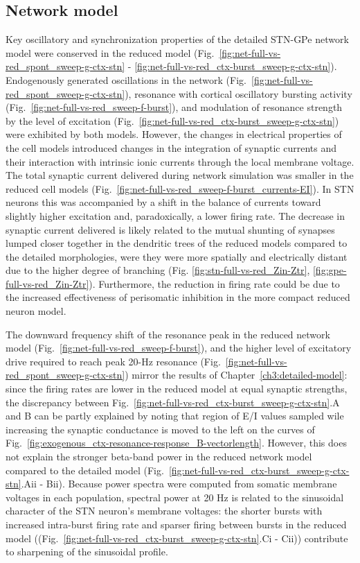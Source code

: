 %
\subsection{Network model}

%
Key oscillatory and synchronization properties of the detailed STN-GPe network
model were conserved in the reduced model (Fig.~\ref{fig:net-full-vs-red_spont_sweep-g-ctx-stn} -
\ref{fig:net-full-vs-red_ctx-burst_sweep-g-ctx-stn}).
%
Endogenously generated oscillations in the network (Fig.~\ref{fig:net-full-vs-red_spont_sweep-g-ctx-stn}),
resonance with cortical oscillatory bursting activity (Fig.~\ref{fig:net-full-vs-red_sweep-f-burst}),
and modulation of resonance strength by the level of excitation (Fig.~\ref{fig:net-full-vs-red_ctx-burst_sweep-g-ctx-stn}) were exhibited by both models.
%
However, the changes in electrical properties of the cell models introduced changes
in the integration of synaptic currents and their interaction with intrinsic ionic currents
through the local membrane voltage. The total synaptic current delivered during
network simulation was smaller in the reduced cell models (Fig.~\ref{fig:net-full-vs-red_sweep-f-burst_currents-EI}).
In STN neurons this was accompanied by a shift in the balance of currents toward
slightly higher excitation and, paradoxically, a lower firing rate.
The decrease in synaptic current delivered is likely related to the mutual shunting of
synapses \cite{segev_what_2006} lumped closer together in the dendritic trees
of the reduced models compared to the detailed morphologies, were they were more
spatially and electrically distant due to the higher degree of branching (Fig.
\ref{fig:stn-full-vs-red_Zin-Ztr}, \ref{fig:gpe-full-vs-red_Zin-Ztr}).
Furthermore, the reduction in firing rate could be due to the increased effectiveness of
perisomatic inhibition in the more compact reduced neuron model.
%

%
The downward frequency shift of the resonance peak in the reduced network model
(Fig.~\ref{fig:net-full-vs-red_sweep-f-burst}), and the higher level of excitatory
drive required to reach peak 20-Hz resonance (Fig.~\ref{fig:net-full-vs-red_spont_sweep-g-ctx-stn})
mirror the results of Chapter~\ref{ch3:detailed-model}: since the firing rates are
lower in the reduced model at equal synaptic strengths, the discrepancy between
Fig.~\ref{fig:net-full-vs-red_ctx-burst_sweep-g-ctx-stn}.A and B can be partly explained by noting that
region of E/I values sampled wile increasing the synaptic conductance is moved to the left on the curves of
Fig.~\ref{fig:exogenous_ctx-resonance-response_B-vectorlength}.
%
However, this does not explain the stronger beta-band power in the reduced network model
compared to the detailed model (Fig.~\ref{fig:net-full-vs-red_ctx-burst_sweep-g-ctx-stn}.Aii - Bii).
Because power spectra were computed from somatic membrane voltages in each population,
spectral power at 20 Hz is related to the sinusoidal character of the STN neuron's membrane voltages:
the shorter bursts with increased intra-burst firing rate and sparser firing between bursts
in the reduced model ((Fig.~\ref{fig:net-full-vs-red_ctx-burst_sweep-g-ctx-stn}.Ci - Cii))
contribute to sharpening of the sinusoidal profile.

